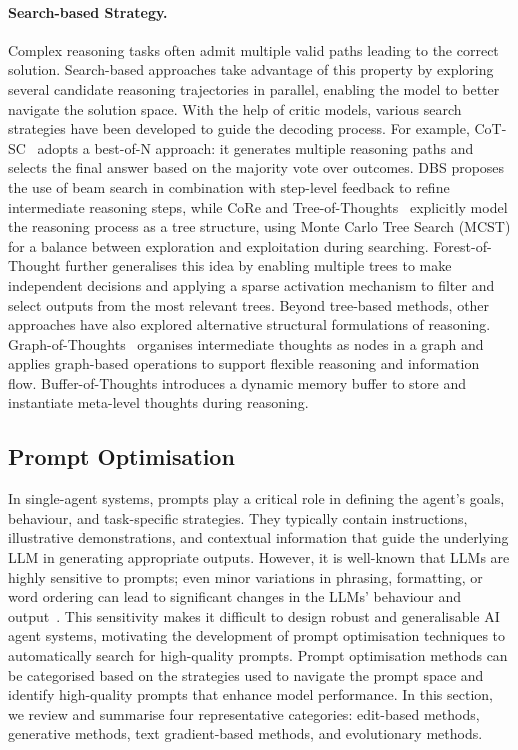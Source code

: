 \documentclass[]{selfevolagent}
\theoremstyle{plain}
\theoremstyle{definition}
\theoremstyle{remark}
\begin{document}
\paragraph{{Search-based Strategy.}} Complex reasoning tasks often admit multiple valid paths leading to the correct solution. Search-based approaches take advantage of this property by exploring several candidate reasoning trajectories in parallel, enabling the model to better navigate the solution space. With the help of critic models, various search strategies have been developed to guide the decoding process. For example, CoT-SC~\citep{wang2023self} adopts a best-of-N approach: it generates multiple reasoning paths and selects the final answer based on the majority vote over outcomes. DBS \citep{zhu2024deductive} proposes the use of beam search in combination with step-level feedback to refine intermediate reasoning steps, while CoRe \citep{zhu-etal-2023-solving} and Tree-of-Thoughts~\citep{yao2023tree} explicitly model the reasoning process as a tree structure, using Monte Carlo Tree Search (MCST) for a balance between exploration and exploitation during searching.
Forest-of-Thought \citep{bi2025forestofthought} further generalises this idea by enabling multiple trees to make independent decisions and applying a sparse activation mechanism to filter and select outputs from the most relevant trees. Beyond tree-based methods, other approaches have also explored alternative structural formulations of reasoning. Graph-of-Thoughts~\citep{besta2024graph} organises intermediate thoughts as nodes in a graph and applies graph-based operations to support flexible reasoning and information flow. Buffer-of-Thoughts \citep{yang2024buffer} introduces a dynamic memory buffer to store and instantiate meta-level thoughts during reasoning.


\subsection{Prompt Optimisation}
\label{subsec:prompt_optimisation}
In single-agent systems, prompts play a critical role in defining the agent's goals, behaviour, and task-specific strategies. They typically contain instructions, illustrative demonstrations, and contextual information that guide the underlying LLM in generating appropriate outputs. However, it is well-known that LLMs are highly sensitive to prompts; even minor variations in phrasing, formatting, or word ordering can lead to significant changes in the LLMs' behaviour and output~\citep{loya2023exploring, zhou2024batch}. This sensitivity makes it difficult to design robust and generalisable AI agent systems, motivating the development of prompt optimisation techniques to automatically search for high-quality prompts. Prompt optimisation methods can be categorised based on the strategies used to navigate the prompt space and identify high-quality prompts that enhance model performance. In this section, we review and summarise four representative categories: edit-based methods, generative methods, text gradient-based methods, and evolutionary methods. 
\end{document}
